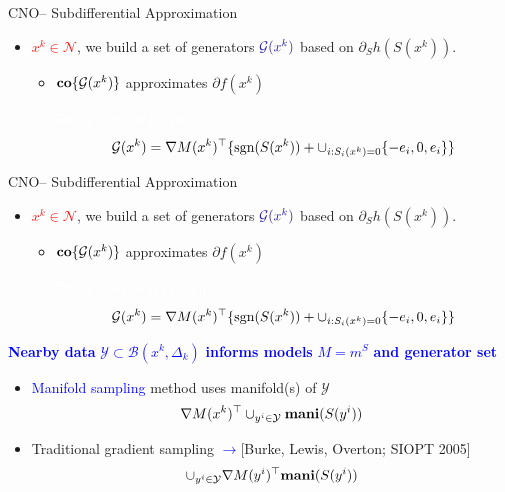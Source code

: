 \documentclass[handout,aspectratio=54]{beamer}
\numberwithin{theorem}{section}
\begin{document}
\begin{frame}{CNO– Subdifferential Approximation}
\begin{itemize}
\item \textcolor{red}{$x^k\in\mathcal{N}$}, we build a set of generators $\textcolor{blue}{\mathcal{G}(x^k)}$ based on $\partial_Sh(S(x^k))$.
	\begin{itemize}
	\item $\textup{\textbf{co}}\{\mathcal{G}(x^k)\}$ approximates $\partial f(x^k)$

	\colorbox[rgb]{0.5,0.6,0.7}{\textcolor{white}{Ex.- $f^1(x)=||S(x)||_1$}}
	\begin{equation*}
	\mathcal{G}(x^k)=\nabla M(x^k)^\top\{\textup{sgn}(S(x^k))+\cup_{i:S_i(x^k)=0}\{-e_i,0,e_i\}\}
	\end{equation*}
	\end{itemize}
\end{itemize}

\vspace{5cm}
\end{frame}

\begin{frame}{CNO– Subdifferential Approximation}
\begin{itemize}
\item \textcolor{red}{$x^k\in\mathcal{N}$}, we build a set of generators $\textcolor{blue}{\mathcal{G}(x^k)}$ based on $\partial_Sh(S(x^k))$.
	\begin{itemize}
	\item $\textup{\textbf{co}}\{\mathcal{G}(x^k)\}$ approximates $\partial f(x^k)$

	\colorbox[rgb]{0.5,0.6,0.7}{\textcolor{white}{Ex.- $f^1(x)=||S(x)||_1$}}
	\begin{equation*}
	\mathcal{G}(x^k)=\nabla M(x^k)^\top\{\textup{sgn}(S(x^k))+\cup_{i:S_i(x^k)=0}\{-e_i,0,e_i\}\}
	\end{equation*}
	\end{itemize}
\end{itemize}

\textcolor{blue}{\textbf{Nearby data} $\mathcal{Y} \subset \mathcal{B}(x^k,\Delta_k)$ \textbf{informs models} $M=m^S$ \textbf{and generator set}}
\begin{itemize}
\item \textcolor{blue}{Manifold sampling} method uses manifold(s) of $\mathcal{Y}$
\begin{equation*}
\nabla M(x^k)^\top \cup_{y^i\in\mathcal{Y}}\textup{\textbf{mani}}(S(y^i))
\end{equation*}

\item Traditional gradient sampling
\flushright\footnotesize\textcolor{blue}{$\rightarrow$}\textcolor[RGB]{128,0,128}{[Burke, Lewis, Overton; SIOPT 2005]}
\normalsize
\begin{equation*}
\cup_{y^i\in\mathcal{Y}}\nabla M(y^i)^\top\textup{\textbf{mani}}(S(y^i))
\end{equation*}
\end{itemize}
\end{frame}
\end{document}
